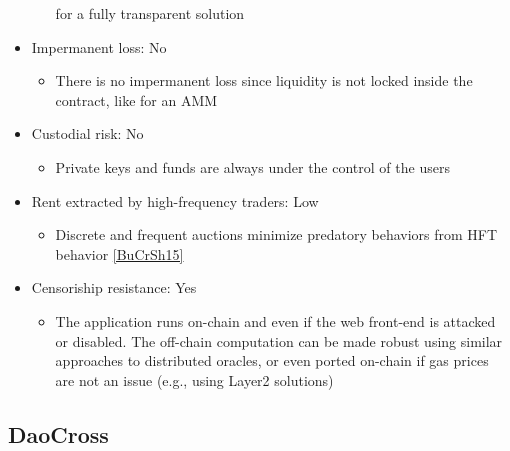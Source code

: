 \documentclass[11pt, reqno]{amsart}
\theoremstyle{definition}
\theoremstyle{remark}
\begin{document}
\begin{itemize}
\begin{itemize}
                for a fully transparent solution
	      \end{itemize}
	\item Impermanent loss: No
	      \begin{itemize}
		      \item There is no impermanent loss since liquidity is not locked inside
                the contract, like for an AMM
	      \end{itemize}
	\item Custodial risk: No
	      \begin{itemize}
		      \item Private keys and funds are always under the control of the users
	      \end{itemize}
	\item Rent extracted by high-frequency traders: Low
	      \begin{itemize}
              \item Discrete and frequent auctions minimize predatory
                behaviors from HFT behavior \ref{BuCrSh15}
	      \end{itemize}
	\item Censoriship resistance: Yes
	      \begin{itemize}
		      \item The application runs on-chain and even if the web front-end is attacked
		            or disabled. The off-chain computation can be made robust using similar
		            approaches to distributed oracles, or even ported on-chain if gas prices
		            are not an issue (e.g., using Layer2 solutions)
	      \end{itemize}
\end{itemize}

\subsection{DaoCross}
\end{document}

